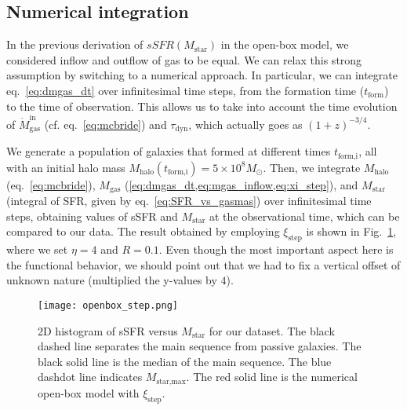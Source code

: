 \documentclass[fleqn,usenatbib]{mnras}
\begin{document}
\subsection{Numerical integration}\label{sec:numerical_integration}
In the previous derivation of $sSFR\left(M_{\text{star}}\right)$ in the open-box model, we considered inflow and outflow of gas to be equal. We can relax this strong assumption by switching to a numerical approach. In particular, we can integrate eq.~\ref{eq:dmgas_dt} over infinitesimal time steps, from the formation time ($t_\text{form}$) to the time of observation. This allows us to take into account the time evolution of $\dot{M}_\text{gas}^\text{in}$ (cf. eq.~\ref{eq:mcbride}) and $\tau_\text{dyn}$, which actually goes as {\small$(1+z)^{-3/4}$}. 

We generate a population of galaxies that formed at different times $t_\text{form,i}$, all with an initial halo mass $M_\text{halo}(t_\text{form,i})=5 \times 10^8 M_\odot$. Then, we integrate $M_\text{halo}$ (eq.~\ref{eq:mcbride}), $M_\text{gas}$ (\cref{eq:dmgas_dt,eq:mgas_inflow,eq:xi_step}), and $M_\text{star}$ (integral of SFR, given by eq.~\ref{eq:SFR_vs_gasmas}) over infinitesimal time steps, obtaining values of sSFR and $M_\text{star}$ at the observational time, which can be compared to our data. The result obtained by employing $\xi_\text{step}$ is shown in Fig.~\ref{fig:openbox_step}, where we set $\eta=4$ and $R=0.1$. Even though the most important aspect here is the functional behavior, we should point out that we had to fix a vertical offset of unknown nature (multiplied the y-values by $4$).  

\begin{figure}\centering
	\texttt{[image: openbox\_step.png]}
    \caption{2D histogram of sSFR versus $M_{\text{star}}$ for our dataset. The black dashed line separates the main sequence from passive galaxies. The black solid line is the median of the main sequence. The blue dashdot line indicates $M_{\text{star,max}}$. The red solid line is the numerical open-box model with $\xi_\text{step}$.}
    \label{fig:openbox_step}
\end{figure}
\end{document}
